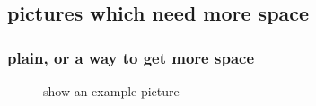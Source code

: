 \documentclass{beamer}
\begin{document}
\subsection{pictures which need more space} 
\begin{frame}[plain]
\frametitle{plain, or a way to get more space}
\begin{figure}
\caption{show an example picture}
\end{figure}
\end{frame}
\end{document}
